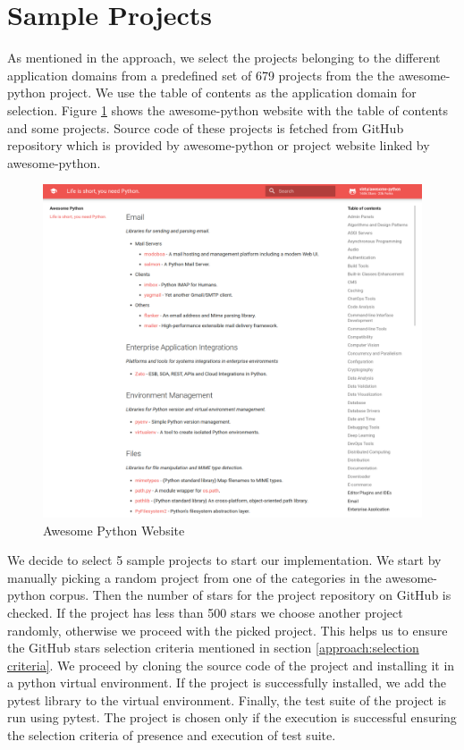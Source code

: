 \section{Sample Projects}
\label{impl:Sample Projects}
As mentioned in the approach, we select the projects belonging to the different application domains from a predefined set of 679 projects from the the awesome-python project.
We use the table of contents as the application domain for selection.
Figure \ref{fig:awesome-python-website} shows the awesome-python website with the table of contents and some projects.
Source code of these projects is fetched from GitHub repository which is provided by awesome-python or project website linked by awesome-python.  
\begin{figure}
    \centering
    \includegraphics[width=1\linewidth, height=1\linewidth]{figures/implementation/Awesome-Python-website3.png}
    \caption{Awesome Python Website}
    \label{fig:awesome-python-website}
\end{figure}

We decide to select 5 sample projects to start our implementation.
We start by manually picking a random project from one of the categories in the awesome-python corpus.
Then the number of stars for the project repository on GitHub is checked.
If the project has less than 500 stars we choose another project randomly, otherwise we proceed with the picked project.
This helps us to ensure the GitHub stars selection criteria mentioned in section \ref{approach:selection criteria}.
We proceed by cloning the source code of the project and installing it in a python virtual environment.
If the project is successfully installed, we add the pytest library to the virtual environment.
Finally, the test suite of the project is run using pytest. 
The project is chosen only if the execution is successful ensuring the selection criteria of presence and execution of test suite.

